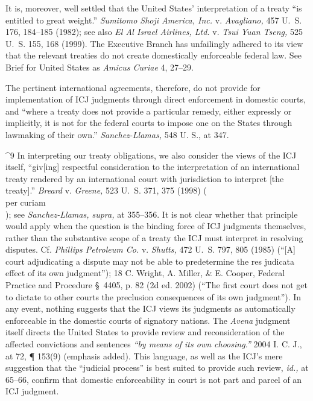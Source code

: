   It is, moreover, well settled that the United States' interpretation
of a treaty ``is entitled to great weight.'' \emph{Sumitomo Shoji
America, Inc.} v. \emph{Avagliano,} 457 U.~S. 176, 184--185 (1982); see
also \emph{El Al Israel Airlines, Ltd.} v. \emph{Tsui Yuan Tseng,} 525 U.~S.
155, 168 (1999). The Executive Branch has unfailingly adhered to its
view that the relevant treaties do not create domestically enforceable
federal law. See Brief for United States as \emph{Amicus Curiae} 4,
27--29.\footnotemark[9]

  The pertinent international agreements, therefore, do not provide for
implementation of ICJ judgments through direct enforcement in domestic
courts, and ``where a treaty does not provide a particular remedy,
either expressly or implicitly, it \newpage  is not for the federal
courts to impose one on the States through lawmaking of their own.''
\emph{Sanchez-Llamas,} 548 U. S., at 347.

^9 In interpreting our treaty obligations, we also consider the
views of the ICJ itself, ``giv[ing] respectful consideration to the
interpretation of an international treaty rendered by an international
court with jurisdiction to interpret [the treaty].'' \emph{Breard}
v. \emph{Greene,} 523 U.~S. 371, 375 (1998) (\\per curiam\\); see
\emph{Sanchez-Llamas, supra,} at 355--356. It is not clear whether
that principle would apply when the question is the binding force
of ICJ judgments themselves, rather than the substantive scope of a
treaty the ICJ must interpret in resolving disputes. Cf. \emph{Phillips
Petroleum Co.} v. \emph{Shutts,} 472 U.~S. 797, 805 (1985) (``[A]
court adjudicating a dispute may not be able to predetermine the res
judicata effect of its own judgment''); 18 C. Wright, A. Miller, \&
E. Cooper, Federal Practice and Procedure \S~4405, p. 82 (2d ed.
2002) (``The first court does not get to dictate to other courts
the preclusion consequences of its own judgment''). In any event,
nothing suggests that the ICJ views its judgments as automatically
enforceable in the domestic courts of signatory nations. The \emph{Avena}
judgment itself directs the United States to provide review and
reconsideration of the affected convictions and sentences \emph{``by means
of its own choosing.''} 2004 I. C. J., at 72, ¶ 153(9) (emphasis
added). This language, as well as the ICJ's mere suggestion that the
``judicial process'' is best suited to provide such review, \emph{id.,}
at 65--66, confirm that domestic enforceability in court is not part
and parcel of an ICJ judgment.

